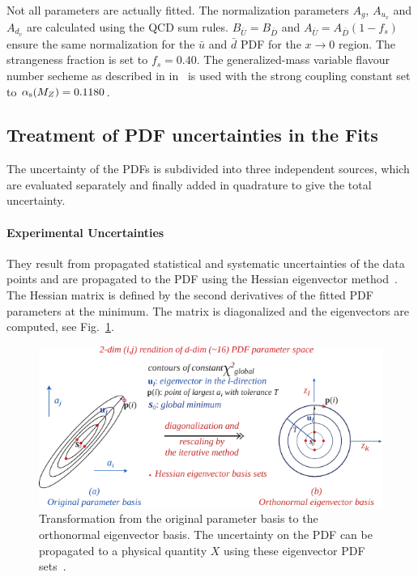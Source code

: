 Not all parameters are actually fitted. The normalization parameters $A_g$,
$A_{u_{v}}$ and $A_{d_{v}}$ are calculated using the QCD sum rules. $B_{\bar
U}=B_{\bar D}$ and $A_{\bar U} = A_{\bar D}(1-f_s)$ ensure the same
normalization for the $\bar u$ and $\bar d$ PDF for the $x \rightarrow 0$
region. The strangeness fraction is set to $f_s = 0.40$. The generalized-mass
variable flavour number secheme as described in
in~\cite{Thorne:1997ga,Thorne:2006qt} is used with the strong coupling constant
set to $\alpha_\mathrm{s}(M_Z)= 0.1180$.


\subsection{Treatment of PDF uncertainties in the Fits}
\label{section:treatment_pdf_uncertainties}

The uncertainty of the PDFs is subdivided into three independent sources, which
are evaluated separately and finally added in quadrature to give the total
uncertainty.

\paragraph{Experimental Uncertainties} 
They result from propagated statistical and systematic uncertainties of the data
points and are propagated to the PDF using the Hessian eigenvector
method~\cite{Pumplin:2001ct}. The Hessian matrix is defined by the second
derivatives of the fitted PDF parameters at the \chisq minimum. The matrix is
diagonalized and the eigenvectors are computed, see
Fig.~\ref{fig:eigenvector_basis_set}. 

\begin{figure}[htb]
  \centering
  \includegraphics[width=1.0\textwidth]{figures/pdf_constraints/hessianmethod.pdf}
  \caption[Transformation of the parameter basis to the eigenvector basis.]
    {Transformation from the original parameter basis to the orthonormal
    eigenvector basis. The uncertainty on the PDF can be propagated to a
    physical quantity $X$ using these eigenvector PDF sets~\cite{Pumplin:2001ct}.}
    \label{fig:eigenvector_basis_set}
\end{figure}

